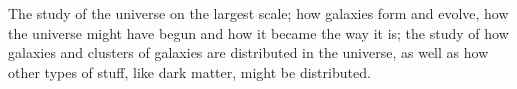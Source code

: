 The study of the universe on the largest scale; how galaxies
form and evolve, how the universe might have begun and how it
became the way it is; the study of how galaxies and
clusters of galaxies are distributed in the universe, as well
as how other types of stuff, like dark matter, might be
distributed.